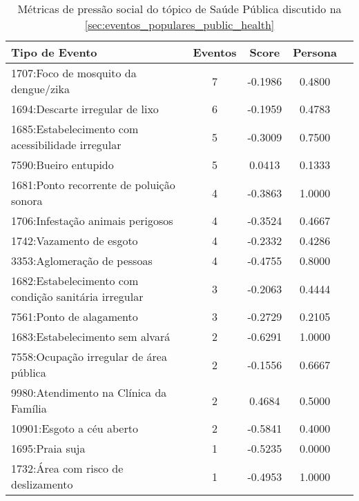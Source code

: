 \begin{table}[htbp]
	\centering
	\caption{Métricas de pressão social do tópico de Saúde Pública discutido na \autoref{sec:eventos_populares_public_health}}
	\label{tab:eventos_populares_public_health}
	\begin{tabular}{|l|c|c|c|c|}
		\hline
		\textbf{Tipo de Evento}                               & \textbf{Eventos} & \textbf{Score} & \textbf{Persona} \\
		\hline
		1707:Foco de mosquito da dengue/zika                  & 7                & -0.1986        & 0.4800           \\
		\hline
		1694:Descarte irregular de lixo                       & 6                & -0.1959        & 0.4783           \\
		\hline
		1685:Estabelecimento com acessibilidade irregular     & 5                & -0.3009        & 0.7500           \\
		\hline
		7590:Bueiro entupido                                  & 5                & 0.0413         & 0.1333           \\
		\hline
		1681:Ponto recorrente de poluição sonora              & 4                & -0.3863        & 1.0000           \\
		\hline
		1706:Infestação animais perigosos                     & 4                & -0.3524        & 0.4667           \\
		\hline
		1742:Vazamento de esgoto                              & 4                & -0.2332        & 0.4286           \\
		\hline
		3353:Aglomeração de pessoas                           & 4                & -0.4755        & 0.8000           \\
		\hline
		1682:Estabelecimento com condição sanitária irregular & 3                & -0.2063        & 0.4444           \\
		\hline
		7561:Ponto de alagamento                              & 3                & -0.2729        & 0.2105           \\
		\hline
		1683:Estabelecimento sem alvará                       & 2                & -0.6291        & 1.0000           \\
		\hline
		7558:Ocupação irregular de área pública               & 2                & -0.1556        & 0.6667           \\
		\hline
		9980:Atendimento na Clínica da Família                & 2                & 0.4684         & 0.5000           \\
		\hline
		10901:Esgoto a céu aberto                             & 2                & -0.5841        & 0.4000           \\
		\hline
		1695:Praia suja                                       & 1                & -0.5235        & 0.0000           \\
		\hline
		1732:Área com risco de deslizamento                   & 1                & -0.4953        & 1.0000           \\
		\hline
	\end{tabular}
\end{table}

